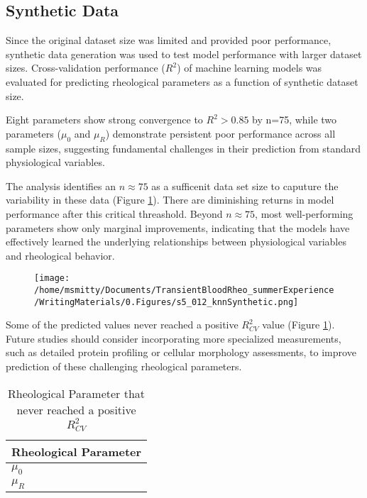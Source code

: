 \documentclass[12pt,letterpaper]{article}
\begin{document}
\subsection{Synthetic Data}
Since the original dataset size was limited and provided poor performance,
synthetic data generation was used to test model performance with larger dataset sizes.
Cross-validation performance ($R^2$) of machine learning models was evaluated for predicting rheological
parameters as a function of synthetic dataset size.

Eight parameters show strong convergence to $R^2 > 0.85$ by n=75, while two parameters ($\mu_0$ and $\mu_R$)
demonstrate persistent poor performance across all sample sizes,
suggesting fundamental challenges in their prediction from standard physiological variables.

The analysis identifies an $n\approx 75$ as a sufficenit data set size to caputure the variability
in these data (Figure \ref{fig:s5012}). There are diminishing returns in model performance after this
critical threashold. Beyond $n\approx 75$, most well-performing parameters show only marginal improvements,
indicating that the models have effectively learned the underlying relationships between physiological variables
and rheological behavior.

\begin{figure}[ht]
    \centering
    \texttt{[image: /home/msmitty/Documents/TransientBloodRheo\_summerExperience/WritingMaterials/0.Figures/s5\_012\_knnSynthetic.png]}
    \caption{}
    \label{fig:s5012}
\end{figure}

Some of the predicted values never reached a positive $R^2_{CV}$ value (Figure \ref{tab:noSyn}).  Future studies should consider incorporating more specialized measurements, such as detailed protein
profiling or cellular morphology assessments, to improve prediction of these challenging rheological parameters.

\begin{table}[ht]
    \centering
    \caption{Rheological Parameter that never reached a positive $R^2_{CV}$}
    \begin{tabular}{l}
        Rheological Parameter\\
        \hline
        $\mu_0$\\
        $\mu_R$
    \end{tabular}
    \label{tab:noSyn}
\end{table}
\end{document}
